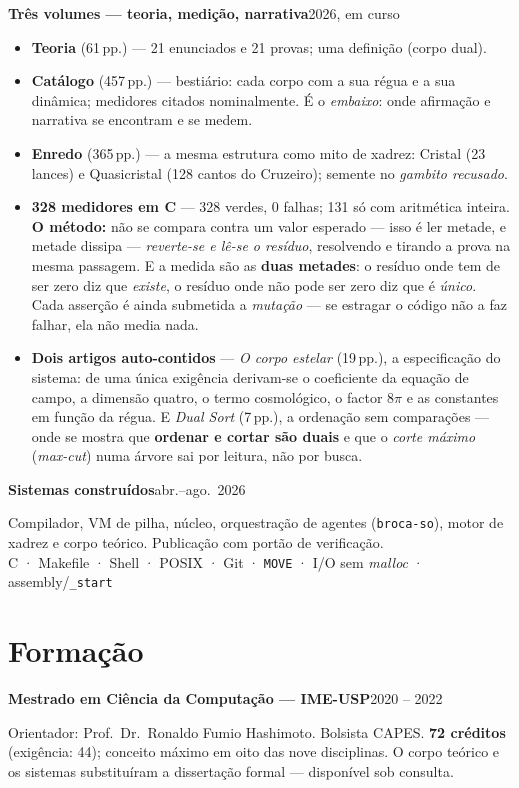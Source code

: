 \documentclass[11pt,a4paper]{article}
\newcommand{\lin}[2]{\noindent\textbf{#1}\hfill{\color{cinza}\small #2}\par}
\begin{document}
\lin{Três volumes --- teoria, medição, narrativa}{2026, em curso}
\begin{itemize}
\item \textbf{Teoria} (61\,pp.) --- 21 enunciados e 21 provas; uma definição (corpo dual).
\item \textbf{Catálogo} (457\,pp.) --- bestiário: cada corpo com a sua régua e a sua dinâmica;
medidores citados nominalmente. É o \emph{embaixo}: onde afirmação e narrativa se encontram
e se medem.
\item \textbf{Enredo} (365\,pp.) --- a mesma estrutura como mito de xadrez: Cristal (23 lances)
e Quasicristal (128 cantos do Cruzeiro); semente no \emph{gambito recusado}.
\item \textbf{328 medidores em C} --- 328 verdes, 0 falhas; 131 só com aritmética inteira.
\textbf{O método:} não se compara contra um valor esperado --- isso é ler metade, e metade dissipa
--- \emph{reverte-se e lê-se o resíduo}, resolvendo e tirando a prova na mesma passagem. E a medida
são as \textbf{duas metades}: o resíduo onde tem de ser zero diz que \emph{existe}, o resíduo onde
não pode ser zero diz que é \emph{único}. Cada asserção é ainda submetida a \emph{mutação} --- se
estragar o código não a faz falhar, ela não media nada.
\item \textbf{Dois artigos auto-contidos} --- \emph{O corpo estelar} (19\,pp.), a especificação do
sistema: de uma única exigência derivam-se o coeficiente da equação de campo, a dimensão quatro, o
termo cosmológico, o factor $8\pi$ e as constantes em função da régua. E \emph{Dual Sort} (7\,pp.),
a ordenação sem comparações --- onde se mostra que \textbf{ordenar e cortar são duais} e que o
\emph{corte máximo} (\emph{max-cut}) numa árvore sai por leitura, não por busca.
\end{itemize}

\smallskip
\lin{Sistemas construídos}{abr.--ago.\ 2026}
Compilador, VM de pilha, núcleo, orquestração de agentes (\texttt{broca-so}), motor de
xadrez e corpo teórico. Publicação com portão de verificação.
\\[1pt]
{\small\color{cinza}C · Makefile · Shell · POSIX · Git · \texttt{MOVE} · I/O sem \emph{malloc}
· assembly/\texttt{\_start}}

\section*{Formação}

\lin{Mestrado em Ciência da Computação --- IME-USP}{2020 -- 2022}
Orientador: Prof.\ Dr.\ Ronaldo Fumio Hashimoto. Bolsista CAPES.
\textbf{72 créditos} (exigência: 44); conceito máximo em oito das nove disciplinas.
O corpo teórico e os sistemas substituíram a dissertação formal --- disponível sob consulta.
\end{document}
